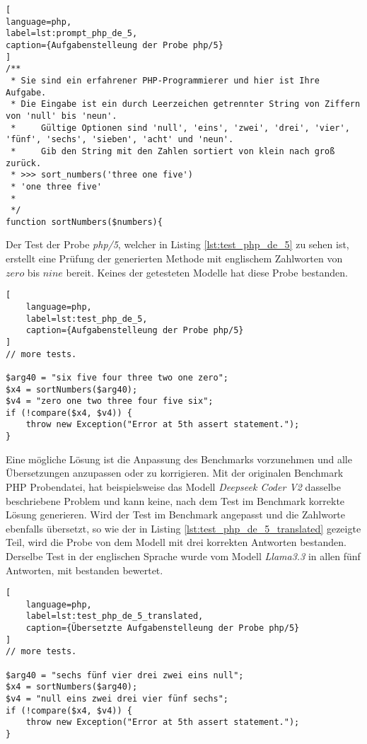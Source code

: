 \begin{lstlisting}[
language=php,
label=lst:prompt_php_de_5,
caption={Aufgabenstelleung der Probe php/5}
]
/**
 * Sie sind ein erfahrener PHP-Programmierer und hier ist Ihre Aufgabe.
 * Die Eingabe ist ein durch Leerzeichen getrennter String von Ziffern von 'null' bis 'neun'.
 *     Gültige Optionen sind 'null', 'eins', 'zwei', 'drei', 'vier', 'fünf', 'sechs', 'sieben', 'acht' und 'neun'.
 *     Gib den String mit den Zahlen sortiert von klein nach groß zurück.
 * >>> sort_numbers('three one five')
 * 'one three five'
 *
 */
function sortNumbers($numbers){
\end{lstlisting}

Der Test der Probe \textit{php/5}, welcher in Listing \ref{lst:test_php_de_5} zu sehen ist, erstellt eine Prüfung der generierten Methode mit englischem Zahlworten von $zero$ bis $nine$ bereit. Keines der getesteten Modelle hat diese Probe bestanden.

\begin{lstlisting}[
	language=php,
	label=lst:test_php_de_5,
	caption={Aufgabenstelleung der Probe php/5}
]
// more tests.

$arg40 = "six five four three two one zero";
$x4 = sortNumbers($arg40);
$v4 = "zero one two three four five six";
if (!compare($x4, $v4)) {
    throw new Exception("Error at 5th assert statement.");
}
\end{lstlisting}

Eine mögliche Lösung ist die Anpassung des Benchmarks vorzunehmen und alle Übersetzungen anzupassen oder zu korrigieren. Mit der originalen Benchmark PHP Probendatei, hat beispielsweise das Modell \textit{Deepseek Coder V2} dasselbe beschriebene Problem und kann keine, nach dem Test im Benchmark korrekte Lösung generieren. Wird der Test im Benchmark angepasst und die Zahlworte ebenfalls übersetzt, so wie der in Listing \ref{lst:test_php_de_5_translated} gezeigte Teil, wird die Probe von dem Modell mit drei korrekten Antworten bestanden. Derselbe Test in der englischen Sprache wurde vom Modell \textit{Llama3.3} in allen fünf Antworten, mit bestanden bewertet.\vspace{0.2cm}

\begin{lstlisting}[
	language=php,
	label=lst:test_php_de_5_translated,
	caption={Übersetzte Aufgabenstelleung der Probe php/5}
]
// more tests.

$arg40 = "sechs fünf vier drei zwei eins null";
$x4 = sortNumbers($arg40);
$v4 = "null eins zwei drei vier fünf sechs";
if (!compare($x4, $v4)) {
    throw new Exception("Error at 5th assert statement.");
}
\end{lstlisting}


